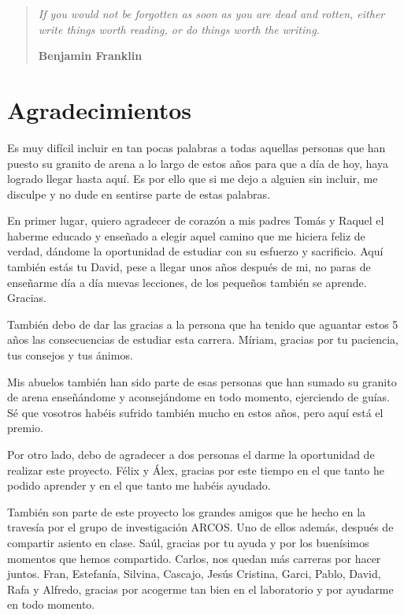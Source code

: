 \thispagestyle{empty}
\vspace*{\fill} 
\begin{quote}
\epigraph{\large \textit{If you would not be forgotten as soon as you are dead and rotten, either write things worth reading, or do things worth the writing.}}{\large \flushright \textbf{Benjamin Franklin}}
\end{quote}
\vspace*{\fill} 

\afterpage{\blankpage} %

\chapter*{Agradecimientos}
%
Es muy difícil incluir en tan pocas palabras a todas aquellas personas que han puesto su granito de arena a lo largo de estos años para que a día de hoy, haya logrado llegar hasta aquí. Es por ello que si me dejo a alguien sin incluir, me disculpe y no dude en sentirse parte de estas palabras.

En primer lugar, quiero agradecer de corazón a mis padres Tomás y Raquel el haberme educado y enseñado a elegir aquel camino que me hiciera feliz de verdad, dándome la oportunidad de estudiar con su esfuerzo y sacrificio. Aquí también estás tu David, pese a llegar unos años después de mi, no paras de enseñarme día a día nuevas lecciones, de los pequeños también se aprende. Gracias.

También debo de dar las gracias a la persona que ha tenido que aguantar estos 5 años las consecuencias de estudiar esta carrera. Míriam, gracias por tu paciencia, tus consejos y tus ánimos. 

Mis abuelos también han sido parte de esas personas que han sumado su granito de arena enseñándome y aconsejándome en todo momento, ejerciendo de guías. Sé que vosotros habéis sufrido también mucho en estos años, pero aquí está el premio.

Por otro lado, debo de agradecer a dos personas el darme la oportunidad de realizar este proyecto. Félix y Álex, gracias por este tiempo en el que tanto he podido aprender y en el que tanto me habéis ayudado.

También son parte de este proyecto los grandes amigos que he hecho en la travesía por el grupo de investigación ARCOS. Uno de ellos además, después de compartir asiento en clase. Saúl, gracias por tu ayuda y por los buenísimos momentos que hemos compartido. Carlos, nos quedan más carreras por hacer juntos. Fran, Estefanía, Silvina, Cascajo, Jesús Cristina, Garci, Pablo, David, Rafa y Alfredo, gracias por acogerme tan bien en el laboratorio y por ayudarme en todo momento.

